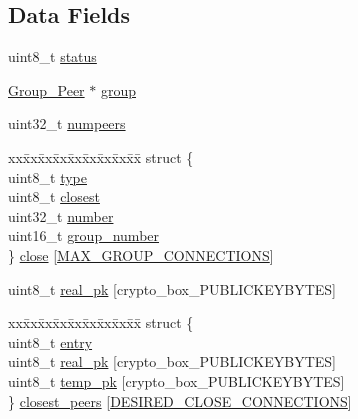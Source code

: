 \subsection*{Data Fields}
\begin{DoxyCompactItemize}
\item 
uint8\+\_\+t \hyperlink{struct_group__c_ade818037fd6c985038ff29656089758d}{status}
\item 
\hyperlink{struct_group___peer}{Group\+\_\+\+Peer} $\ast$ \hyperlink{struct_group__c_a1f68599dc07252599a98f6d044a184e9}{group}
\item 
uint32\+\_\+t \hyperlink{struct_group__c_a6c81294c96de8914431dbf825934b528}{numpeers}
\item 
\begin{tabbing}
xx\=xx\=xx\=xx\=xx\=xx\=xx\=xx\=xx\=\kill
struct \{\\
\>uint8\_t \hyperlink{struct_group__c_a1d127017fb298b889f4ba24752d08b8e}{type}\\
\>uint8\_t \hyperlink{struct_group__c_a8ff1adca518d82728e7d450f6d14e8db}{closest}\\
\>uint32\_t \hyperlink{struct_group__c_ad50c630d233a71112a7df136970caefc}{number}\\
\>uint16\_t \hyperlink{struct_group__c_a60c6a6ce4c702d61048d0f38f3974ef8}{group\_number}\\
\} \hyperlink{struct_group__c_a6c24608383f70ad37f70307f492e3abc}{close} \mbox{[}\hyperlink{toxcore_2group_8h_ab4d6c744a36e49e0aa6cb3f1ea3de0f7}{MAX\_GROUP\_CONNECTIONS}\mbox{]}\\

\end{tabbing}\item 
uint8\+\_\+t \hyperlink{struct_group__c_ab42b4c90d81ac99b968c3edd1e21d706}{real\+\_\+pk} \mbox{[}crypto\+\_\+box\+\_\+\+P\+U\+B\+L\+I\+C\+K\+E\+Y\+B\+Y\+T\+E\+S\mbox{]}
\item 
\begin{tabbing}
xx\=xx\=xx\=xx\=xx\=xx\=xx\=xx\=xx\=\kill
struct \{\\
\>uint8\_t \hyperlink{struct_group__c_adbdb38b7f14c384804844026547a276e}{entry}\\
\>uint8\_t \hyperlink{struct_group__c_ab42b4c90d81ac99b968c3edd1e21d706}{real\_pk} \mbox{[}crypto\_box\_PUBLICKEYBYTES\mbox{]}\\
\>uint8\_t \hyperlink{struct_group__c_a46affbcc202b25e96fd1f5238e9e97e0}{temp\_pk} \mbox{[}crypto\_box\_PUBLICKEYBYTES\mbox{]}\\
\} \hyperlink{struct_group__c_a8987e8417b5a1a5bc11ba79885c12590}{closest\_peers} \mbox{[}\hyperlink{toxcore_2group_8h_ae49a7f6c02e0c31ee7e1a84b529f33d7}{DESIRED\_CLOSE\_CONNECTIONS}\mbox{]}\\


\end{tabbing}
\end{DoxyCompactItemize}
